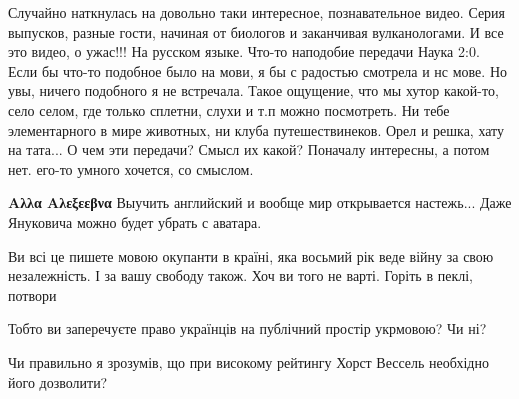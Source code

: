 \begin{itemize}
Случайно наткнулась на довольно таки интересное, познавательное видео. Серия
выпусков, разные гости, начиная от биологов и заканчивая вулканологами. И все
это видео, о ужас!!! На русском языке. Что-то наподобие передачи Наука 2:0.
Если бы что-то подобное было на мови, я бы с радостью смотрела и нс мове. Но
увы, ничего подобного я не встречала. Такое ощущение, что мы хутор какой-то,
село селом, где только сплетни, слухи и т.п можно посмотреть. Ни тебе
элементарного в мире животных, ни клуба путешествинеков. Орел и решка, хату на
тата... О чем эти передачи? Смысл их какой? Поначалу интересны, а потом нет.
его-то умного хочется, со смыслом.

\begin{itemize}
 
\textbf{Αλλα Αλεξεεβνα} Выучить английский и вообще мир открывается настежь... Даже Януковича можно будет убрать с аватара.
\end{itemize}

 

Ви всі це пишете мовою окупанти в країні, яка восьмий рік веде війну за свою
незалежність. І за вашу свободу також. Хоч ви того не варті. Горіть в пеклі,
потвори


 
Тобто ви заперечуєте право українців на публічний простір укрмовою? Чи ні?

 
Чи правильно я зрозумів, що при високому рейтингу Хорст Вессель необхідно його дозволити?


\end{itemize}
